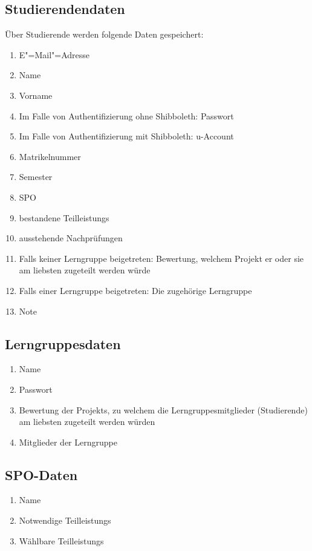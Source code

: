 \documentclass[parskip=full]{scrartcl}
\newcommand{\swtLabel}[1]{\textbf{/#1\arabic*0/}}
\begin{document}
\subsection{Studierendendaten} 
Über Studierende werden folgende Daten gespeichert:
\begin{enumerate}[label=\swtLabel{D}, resume] 
  \item E"=Mail"=Adresse \label{SDatenAnfang}
  \item Name
  \item Vorname
  \item Im Falle von Authentifizierung ohne Shibboleth: Passwort
  \item Im Falle von Authentifizierung mit Shibboleth: u-Account
  \item Matrikelnummer
  \item Semester
  \item SPO
  \item bestandene \glspl{Teilleistung} 
  \item ausstehende Nachprüfungen \label{SDatenEnde}
  
  \item Falls keiner \gls{Lerngruppe} beigetreten: Bewertung, welchem Projekt er oder
  sie am liebsten zugeteilt werden würde
  \item Falls einer \gls{Lerngruppe} beigetreten: Die zugehörige
  \gls{Lerngruppe}
  \item Note
\end{enumerate}
\subsection{\glspl{Lerngruppe}daten} 
\begin{enumerate}[label=\swtLabel{D}, resume] 
  \item Name
  \item Passwort
  \item Bewertung der \glspl{Projekt}, zu welchem die \glspl{Lerngruppe}mitglieder
  (Studierende) am liebsten zugeteilt werden würden
  \item Mitglieder der \gls{Lerngruppe}
\end{enumerate}

\subsection{SPO-Daten}
\begin{enumerate}[label=\swtLabel{D}, resume]
	\item Name
	\item Notwendige \glspl{Teilleistung}
	\item Wählbare \glspl{Teilleistung}
\end{enumerate}
\end{document}
